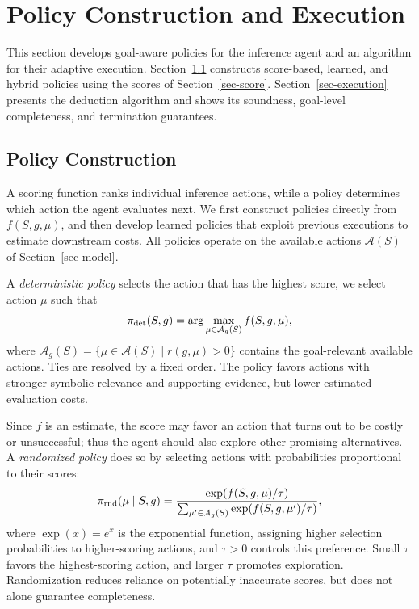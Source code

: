 \vspace{-0.3ex}
\section{Policy Construction and Execution}
\label{sec-classes}
\vspace{-0.2ex}

This section develops goal-aware policies for the
inference agent and an algorithm for their adaptive
execution. Section~\ref{sec-policies} constructs
score-based, learned, and hybrid policies using the
scores of Section~\ref{sec-score}.
Section~\ref{sec-execution} presents the %
deduction
algorithm and shows its soundness,
goal-level completeness, and termination guarantees.

\vspace{-1ex}
\subsection{Policy Construction}
\label{sec-policies}
\vspace{-0.2ex}

A scoring function ranks individual inference
actions, while a policy determines which action
the agent evaluates next. We first construct
policies directly from $f(S,g,\mu)$, and then
develop learned policies that exploit previous
executions to estimate downstream costs.
All policies operate on the available actions
$\mathcal A(S)$ of Section~\ref{sec-model}.

A {\em deterministic policy} selects the  action that has the
highest score, \ie we select action $\mu$ such that
\vspace{-0.7ex}\[
\pi_{\rm det}(S,g)=
\arg\max_{\mu\in\mathcal A_g(S)}f(S,g,\mu),
\vspace{-0.7ex}\]
where
$\mathcal A_g(S)=
\{\mu\in\mathcal A(S)\mid r(g,\mu)>0\}$
contains the goal-relevant available actions.
Ties are resolved by a fixed order.
The policy favors actions with stronger
symbolic relevance and supporting evidence,
but lower estimated evaluation costs.

Since $f$ is an estimate, the score may favor an action that turns out
to be costly or unsuccessful; thus the agent should
also explore other promising alternatives.
A {\em randomized policy} does so by selecting actions
with probabilities proportional to their scores:
\vspace{-0.7ex}\[
\pi_{\rm rnd}(\mu\mid S,g)=
\frac{\exp(f(S,g,\mu)/\tau)}
{\sum_{\mu'\in\mathcal A_g(S)}
\exp(f(S,g,\mu')/\tau)},
\vspace{-0.7ex}\]
where $\exp(x)=e^x$ is the exponential function,
assigning higher selection probabilities
to higher-scoring actions, and $\tau>0$ controls
this preference. Small $\tau$ favors the
highest-scoring action, and larger $\tau$
promotes exploration. Randomization reduces
reliance on potentially inaccurate scores,
but does not alone guarantee completeness.

